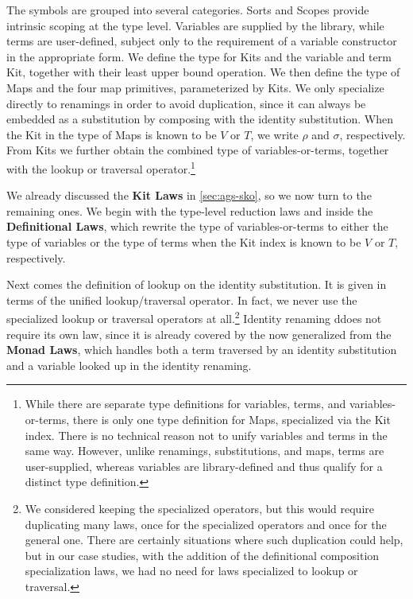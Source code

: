 \documentclass[screen,nonacm]{acmart}
\begin{document}
The symbols are grouped into several categories. Sorts and Scopes provide
intrinsic scoping at the type level. Variables are supplied by the library,
while terms are user-defined, subject only to the requirement of a variable
constructor in the appropriate form. We define the type for Kits and the
variable and term Kit, together with their least upper bound operation. We then
define the type of Maps and the four map primitives, parameterized by Kits. We
only specialize  directly to renamings in order to avoid
duplication, since it can always be embedded as a substitution by composing
with the identity substitution. When the Kit in the type of Maps is known to be
$V$ or $T$, we write $\rho$ and $\sigma$, respectively. From Kits we further
obtain the combined type of variables-or-terms, together with the lookup or
traversal operator.\footnote{While there are separate type definitions for
      variables, terms, and variables-or-terms, there is only one type definition for
      Maps, specialized via the Kit index. There is no technical reason not to unify
      variables and terms in the same way. However, unlike renamings, substitutions,
      and maps, terms are user-supplied, whereas variables are library-defined and
      thus qualify for a distinct type definition.}%

We already discussed the \textbf{Kit Laws} in \cref{sec:ags-sko}, so we now
turn to the remaining ones. We begin with the type-level reduction laws
 and  inside the \textbf{Definitional
      Laws}, which rewrite the type of variables-or-terms to either the type of
variables or the type of terms when the Kit index is known to be $V$ or $T$,
respectively.

Next comes the definition of lookup on the identity substitution. It is given
in terms of the unified lookup/traversal operator. In fact, we never use the
specialized lookup or traversal operators at all.\footnote{ We considered
      keeping the specialized operators, but this would require duplicating many
      laws, once for the specialized operators and once for the general one. There
      are certainly situations where such duplication could help, but in our case
      studies, with the addition of the definitional composition specialization laws,
      we had no need for laws specialized to lookup or traversal.} Identity renaming
ddoes not require its own law, since it is already covered by the now
generalized  from the \textbf{Monad Laws}, which handles
both a term traversed by an identity substitution and a variable looked up in
the identity renaming.
\end{document}
